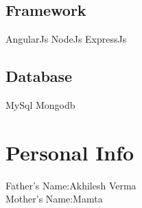 \documentclass[]{resume-openfont}
\begin{document}
\begin{minipage}[t]{0.33\textwidth}
\subsection{Framework}
AngularJs \textbullet{} NodeJs \textbullet{} ExpressJs \textbullet{}
\subsection{Database}
MySql \textbullet{} Mongodb \textbullet{} 
\sectionsep

\section{Personal Info}
Father's Name:Akhilesh Verma\\
Mother's Name:Mamta\\

%
%

\end{minipage} 
\hfill
\end{document}
